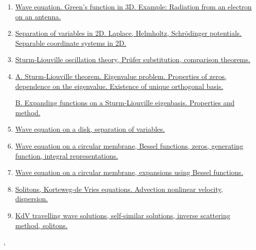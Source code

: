 \documentclass[11pt]{article}
\renewcommand{\today}{\shortmonthname[\the\month] \the \day,  \the\year}
\begin{document}
\begin{enumerate}
	\item \href{https://mp.weixin.qq.com/s/Cx9uEPWa1ayk6lpOTYRE1w}{Wave equation. Green's function in 3D. Example: Radiation from an electron on an antenna.}
	
	\item \href{https://mp.weixin.qq.com/s/WLgsogFajC4LHZQaNTOkEQ}{Separation of variables in 2D. Laplace, Helmholtz, Schrödinger potentials. Separable coordinate systems in 2D.}
	
	\item \href{https://mp.weixin.qq.com/s/k6tTozi3IWIFeMnveaZPvQ}{Sturm-Liouville oscillation theory, Prüfer substitution, comparison theorems.}
	
	\item \href{https://mp.weixin.qq.com/s/LeQORty_UcpUdiMR4kfuDw}{A. Sturm-Liouville theorem. Eigenvalue problem. Properties of zeros, dependence on the eigenvalue. Existence of unique orthogonal basis.}
	
	\href{https://mp.weixin.qq.com/s/bdndwsTEoQBAdZHxzcguXg}{B. Expanding functions on a Sturm-Liouville eigenbasis. Properties and method.}
	
	\item \href{https://mp.weixin.qq.com/s/fgNLvHiki8m_7c4XfRnLFg}{Wave equation on a disk, separation of variables.}
	
	\item \href{https://mp.weixin.qq.com/s/tx5hjtMI9wsodNrGJAuvXw}{Wave equation on a circular membrane, Bessel functions, zeros, generating function, integral representations.}
	
	\item \href{https://mp.weixin.qq.com/s/V84By0sU00ZGaT8RQgbrFg}{Wave equation on a circular membrane, expansions using Bessel functions.}
	
	\item \href{https://mp.weixin.qq.com/s/MRBlY6sBupEPC-CwT3wH1w}{Solitons, Korteweg-de Vries equations. Advection nonlinear velocity, dispersion.}
	
	\item \href{https://mp.weixin.qq.com/s/2K5PKGS9yPG1thhHNuqSiA}{KdV travelling wave solutions, self-similar solutions, inverse scattering method, solitons.}
	
\end{enumerate}





%
\begin{flushright}
	\tiny \today 
\end{flushright}
\end{document}
